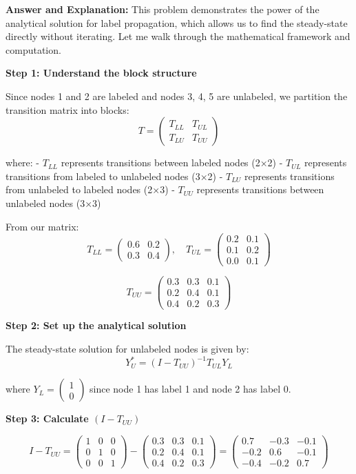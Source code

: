 \documentclass[11pt]{article}
\newenvironment{answer}{\color{answercolor}\begin{framed}\textbf{Answer and Explanation:}}{\end{framed}}
\begin{document}
\begin{answer}
This problem demonstrates the power of the analytical solution for label propagation, which allows us to find the steady-state directly without iterating. Let me walk through the mathematical framework and computation.

\textbf{Step 1: Understand the block structure}

Since nodes 1 and 2 are labeled and nodes 3, 4, 5 are unlabeled, we partition the transition matrix into blocks:
$$T = \begin{pmatrix}
T_{LL} & T_{UL} \\
T_{LU} & T_{UU}
\end{pmatrix}$$

where:
- $T_{LL}$ represents transitions between labeled nodes (2×2)
- $T_{UL}$ represents transitions from labeled to unlabeled nodes (3×2)  
- $T_{LU}$ represents transitions from unlabeled to labeled nodes (2×3)
- $T_{UU}$ represents transitions between unlabeled nodes (3×3)

From our matrix:
$$T_{LL} = \begin{pmatrix} 0.6 & 0.2 \\ 0.3 & 0.4 \end{pmatrix}, \quad T_{UL} = \begin{pmatrix} 0.2 & 0.1 \\ 0.1 & 0.2 \\ 0.0 & 0.1 \end{pmatrix}$$

$$T_{UU} = \begin{pmatrix} 0.3 & 0.3 & 0.1 \\ 0.2 & 0.4 & 0.1 \\ 0.4 & 0.2 & 0.3 \end{pmatrix}$$

\textbf{Step 2: Set up the analytical solution}

The steady-state solution for unlabeled nodes is given by:
$$Y_U^* = (I - T_{UU})^{-1} T_{UL} Y_L$$

where $Y_L = \begin{pmatrix} 1 \\ 0 \end{pmatrix}$ since node 1 has label 1 and node 2 has label 0.

\textbf{Step 3: Calculate $(I - T_{UU})$}

$$I - T_{UU} = \begin{pmatrix} 1 & 0 & 0 \\ 0 & 1 & 0 \\ 0 & 0 & 1 \end{pmatrix} - \begin{pmatrix} 0.3 & 0.3 & 0.1 \\ 0.2 & 0.4 & 0.1 \\ 0.4 & 0.2 & 0.3 \end{pmatrix} = \begin{pmatrix} 0.7 & -0.3 & -0.1 \\ -0.2 & 0.6 & -0.1 \\ -0.4 & -0.2 & 0.7 \end{pmatrix}$$


\end{answer}
\end{document}
